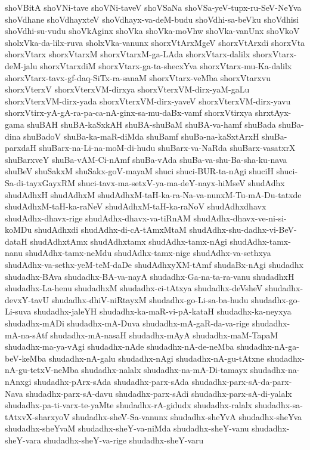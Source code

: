 {shoVBitA
shoVNi-tave
shoVNi-taveV
shoVSaNa
shoVSa-yeV-tupx-ru-SeV-NeYva
shoVdhane
shoVdhayxteV
shoVdhayx-va-deM-budu
shoVdhi-sa-beVku
shoVdhisi
shoVdhi-su-vudu
shoVkAginx
shoVka
shoVka-moVhw
shoVka-vanUnx
shoVkoV
sholxVka-da-lilx-ruva
sholxVka-vanunx
shorxVtArxMgeV
shorxVtArxdi
shorxVta
shorxVtarx
shorxVtarxM
shorxVtarxM-ga-LAda
shorxVtarx-dalilx
shorxVtarx-deM-jalu
shorxVtarxdiM
shorxVtarx-ga-ta-shecxYva
shorxVtarx-mu-Ka-dalilx
shorxVtarx-tavx-gf-daq-SiTx-ra-sanaM
shorxVtarx-veMba
shorxVtarxvu
shorxVterxV
shorxVterxVM-dirxya
shorxVterxVM-dirx-yaM-gaLu
shorxVterxVM-dirx-yada
shorxVterxVM-dirx-yaveV
shorxVterxVM-dirx-yavu
shorxVtirx-yA-gA-ra-pa-ca-nA-ginx-sa-mu-daBx-vamf
shorxVtirxya
shrxtAyx-gama
shuBAH
shuBA-kaSxkAH
shuBA-shuBaM
shuBA-va-hamf
shuBada
shuBa-dina
shuBadoV
shuBa-ka-maR-diMda
shuBamf
shuBa-na-kaSxtArxH
shuBa-parxdaH
shuBarx-na-Li-na-moM-di-hudu
shuBarx-va-NaRda
shuBarx-vasatxrX
shuBarxveY
shuBa-vAM-Ci-nAmf
shuBa-vAda
shuBa-va-shu-Ba-sha-ku-nava
shuBeV
shuSakxM
shuSakx-goV-mayaM
shuci
shuci-BUR-ta-nAgi
shuciH
shuci-Sa-di-tayxGayxRM
shuci-tavx-ma-setxV-ya-ma-deY-nayx-hiMseV
shudAdhx
shudAdhxH
shudAdhxM
shudAdhxM-taH-ka-ra-Na-va-nunxM-Tu-mA-Du-tatxde
shudAdhxM-taH-ka-raNeV
shudAdhxM-taH-ka-raNoV
shudAdhxdhavx
shudAdhx-dhavx-rige
shudAdhx-dhavx-va-tiRnAM
shudAdhx-dhavx-ve-ni-si-koMDu
shudAdhxdi
shudAdhx-di-cA-tAmxMtaM
shudAdhx-shu-dadhx-vi-BeV-dataH
shudAdhxtAmx
shudAdhxtamx
shudAdhx-tamx-nAgi
shudAdhx-tamx-nanu
shudAdhx-tamx-neMdu
shudAdhx-tamx-nige
shudAdhx-va-sethxya
shudAdhx-va-sethx-yeM-teM-daDe
shudAdhxyXM-tAmf
shudaBx-nAgi
shudadhx
shudadhx-BAva
shudadhx-BA-va-nayA
shudadhx-Ga-na-ta-ra-vanu
shudadhxH
shudadhx-La-henu
shudadhxM
shudadhx-ci-tAtxya
shudadhx-deVsheV
shudadhx-devxY-tavU
shudadhx-dhiV-niRtayxM
shudadhx-go-Li-sa-ba-hudu
shudadhx-go-Li-suva
shudadhx-jaleYH
shudadhx-ka-maR-vi-pA-kataH
shudadhx-ka-neyxya
shudadhx-mADi
shudadhx-mA-Duva
shudadhx-mA-gaR-da-va-rige
shudadhx-mA-na-sAtf
shudadhx-mA-nasaH
shudadhx-mAyA
shudadhx-maM-TapaM
shudadhx-ma-ya-vAgi
shudadhx-nAde
shudadhx-nA-de-neMba
shudadhx-nA-ga-beV-keMba
shudadhx-nA-galu
shudadhx-nAgi
shudadhx-nA-gu-tAtxne
shudadhx-nA-gu-tetxV-neMba
shudadhx-nalalx
shudadhx-na-mA-Di-tamayx
shudadhx-na-nAnxgi
shudadhx-pArx-sAda
shudadhx-parx-sAda
shudadhx-parx-sA-da-parx-Nava
shudadhx-parx-sA-davu
shudadhx-parx-sAdi
shudadhx-parx-sA-di-yalalx
shudadhx-pa-ti-varx-te-yaMte
shudadhx-rA-gidudx
shudadhx-ralalx
shudadhx-sa-tAtxvX-sharxyoV
shudadhx-sheV-Sa-vanunx
shudadhx-sheYvA
shudadhx-sheYva
shudadhx-sheYvaM
shudadhx-sheY-va-niMda
shudadhx-sheY-vanu
shudadhx-sheY-vara
shudadhx-sheY-va-rige
shudadhx-sheY-varu
}
